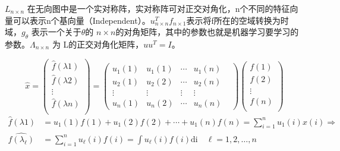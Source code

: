     \begin{myRemark}
        $ L _{n \times n}$ 在无向图中是一个实对称阵，实对称阵可对正交对角化，n个不同的特征向量可以表示n个基向量（Independent）。$ u ^ { T } _{ n \times n }f _{n \times 1 }$表示将f所在的空域转换为时域，$g_{\theta} $ 表示一个关于$ \theta $的 $ n \times n $的对角矩阵，其中的参数也就是机器学习要学习的参数。$ \Lambda _{ n \times n }$ 为 L的正交对角化矩阵，$ u u ^ { T }  = I $。

        \[
            \hat{x} =  \begin{pmatrix}
                \hat{f}\left ( {\lambda 1} \right )  \\
                \hat{f}\left ( {\lambda 2} \right )  \\
                \vdots\\
                \hat{f}\left ( {\lambda n} \right )  \\
                
                \end{pmatrix} 
            = \begin{pmatrix}
                u_{1} \left ( 1 \right ) &  u_{1} \left ( 1 \right ) & \cdots&  u_{1} \left ( n \right )& \\
                u_{2} \left ( 1 \right ) &  u_{2} \left ( 2 \right ) & \cdots&  u_{2} \left ( n \right )&\\
               \vdots & \vdots & \vdots &  \vdots& \\
                 u_{n} \left ( 1 \right ) &  u_{n} \left ( 2 \right ) & \cdots&  u_{n} \left ( n \right )&
              \end{pmatrix} 
              \begin{pmatrix}
                f\left ( { 1 } \right )  \\
                f\left ( { 2 } \right ) \\
                \vdots\\
                f\left ( { n } \right )  \\
             \end{pmatrix}\]
        \begin{align*} 
            \hat{f} \left ( {\lambda 1} \right )   & =  u_{1} \left ( 1 \right ) f(1) + u_{1} \left ( 2 \right ) f(2) + \cdots + u_{1} \left ( n \right ) f(n) = \sum_{i = 1} ^{n}  u_{1} \left ( i \right ) x(i) \Longrightarrow \\
            \hat{f\left ( {\lambda_{\ell }} \right )}  & = \sum_{i = 1} ^{n}  u_{\ell } \left ( i \right ) f(i)   = \int u_{\ell } \left ( i \right ) f(i) \mathrm{d i}  \quad \ell  = 1 , 2 ,\dots , n  
        \end{align*}
    \end{myRemark}
